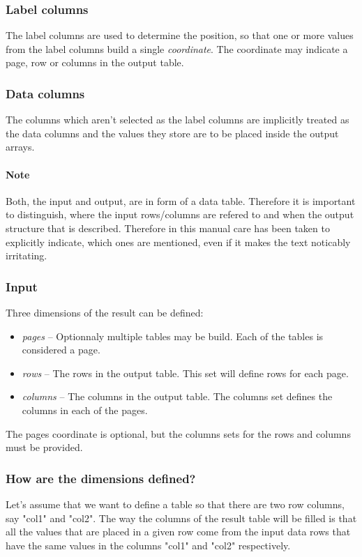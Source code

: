 \documentclass{report}
\begin{document}
\subsubsection{Label columns}
The label columns are used to determine the position, so that one or more values
from the label columns build a single \textit{coordinate}. The coordinate may
indicate a page, row or columns in the output table.

\subsubsection{Data columns}
The columns which aren't selected as the label columns are implicitly treated as
the data columns and the values they store are to be placed inside the output
arrays.

\paragraph{Note}
Both, the input and output, are in form of a data table. Therefore it is important
to distinguish, where the input rows/columns are refered to and when the output
structure that is described. Therefore in this manual care has been taken 
to explicitly indicate, which ones are mentioned, even if it makes the text
noticably irritating.

\subsubsection{Input}
Three dimensions of the result can be defined:

\begin{itemize}
	\item \textit{pages} -- Optionnaly multiple tables may be build. Each
		of the tables is considered a page.
	\item \textit{rows} -- The rows in the output table. This set will define
		rows for each page.
	\item \textit{columns} -- The columns in the output table. The columns
		set defines the columns in each of the pages.
\end{itemize}

The pages coordinate is optional, but the columns sets for the rows and columns
must be provided.

\subsubsection{How are the dimensions defined?}
Let's assume that we want to define a table so that there are two row columns,
say "col1" and "col2". The way the columns of the result table will be filled
is that all the values that are placed in a given row come from the input data
rows that have the same values in the columns "col1" and "col2" respectively.
\end{document}
